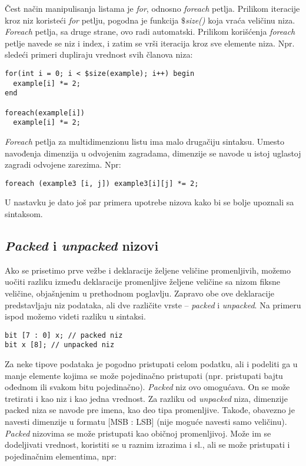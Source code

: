 Čest način manipulisanja listama je \emph{for}, odnosno \emph{foreach} petlja.
Prilikom iteracije kroz niz koristeći \emph{for} petlju, pogodna je funkcija
\emph{\(\$\)size()} koja vraća veličinu niza.
\emph{Foreach} petlja, sa druge strane, ovo radi automatski.
Prilikom korišćenja \emph{foreach} petlje navede se niz i index, i zatim se vrši
iteracija kroz sve elemente niza.
Npr. sledeći primeri dupliraju vrednost svih članova niza:

\begin{lstlisting}
for(int i = 0; i < $size(example); i++) begin
  example[i] *= 2;
end

foreach(example[i])
  example[i] *= 2;
\end{lstlisting}

\emph{Foreach} petlja za multidimenzionu listu ima malo drugačiju sintaksu.
Umesto navođenja dimenzija u odvojenim zagradama, dimenzije se navode u istoj
uglastoj zagradi odvojene zarezima. Npr:

\begin{lstlisting}
foreach (example3 [i, j]) example3[i][j] *= 2;
\end{lstlisting}

U nastavku je dato još par primera upotrebe nizova kako bi se bolje upoznali sa sintaksom.




\subsection{\emph{Packed} i \emph{unpacked} nizovi}

Ako se prisetimo prve vežbe i deklaracije željene veličine promenljivih, možemo
uočiti razliku između deklaracije promenljive željene veličine sa nizom fiksne
veličine, objašnjenim u prethodnom poglavlju. Zapravo obe ove deklaracije
predstavljaju niz podataka, ali dve različite vrste – \emph{packed} i
\emph{unpacked}. Na primeru ispod možemo videti razliku u sintaksi.

\begin{lstlisting}
bit [7 : 0] x; // packed niz
bit x [8]; // unpacked niz
\end{lstlisting}

Za neke tipove podataka je pogodno pristupati celom podatku, ali i podeliti ga u
manje elemente kojima se može pojedinačno pristupati (npr. pristupati bajtu
ođednom ili svakom bitu pojedinačno).
\emph{Packed} niz ovo omogućava.
On se može tretirati i kao niz i kao jedna vrednost.
Za razliku od \emph{unpacked} niza, dimenzije packed niza se navode pre imena,
kao deo tipa promenljive.
Takođe, obavezno je navesti dimenzije u formatu [MSB : LSB] (nije moguće
navesti samo veličinu).
\emph{Packed} nizovima se može pristupati kao običnoj promenljivoj.
Može im se dodeljivati vrednost, koristiti se u raznim izrazima i sl., ali se
može pristupati i pojedinačnim elementima, npr:

